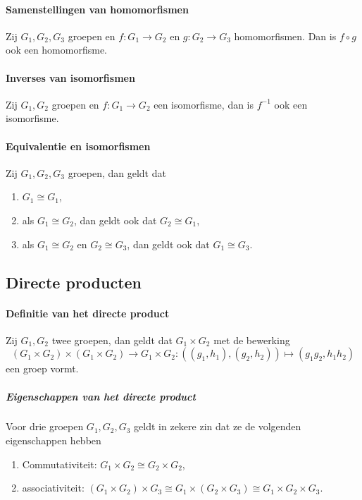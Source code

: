 \paragraph{Samenstellingen van homomorfismen} Zij \(G_{1},G_{2},G_{3}\) groepen en \(f\colon G_{1}\to G_{2}\) en \(g\colon G_{2}\to G_{3}\) homomorfismen. Dan is \(f\circ g\) ook een homomorfisme.

\paragraph{Inverses van isomorfismen} Zij \(G_{1},G_{2}\) groepen en \(f\colon G_{1}\to G_{2}\) een isomorfisme, dan is \(f^{-1}\) ook een isomorfisme.

\paragraph{Equivalentie en isomorfismen} Zij \(G_{1},G_{2},G_{3}\) groepen, dan geldt dat
\begin{enumerate}
    \item \(G_{1}\cong G_{1}\),
    \item als \(G_{1}\cong G_{2}\), dan geldt ook dat \(G_{2}\cong G_{1}\),
    \item als \(G_{1}\cong G_{2}\) en \(G_{2}\cong G_{3}\), dan geldt ook dat \(G_{1}\cong G_{3}\).
\end{enumerate}

\subsection{Directe producten}
\paragraph{Definitie van het directe product} Zij \(G_{1},G_{2}\) twee groepen, dan geldt dat \(G_{1}\times G_{2}\) met de bewerking
\[
    (G_{1}\times G_{2})\times(G_{1}\times G_{2})\to G_{1}\times G_{2}\colon ((g_{1},h_{1}),(g_{2},h_{2}))\mapsto (g_{1}g_{2},h_{1}h_{2})
\]
een groep vormt.

\subparagraph{Eigenschappen van het directe product} Voor drie groepen \(G_{1},G_{2},G_{3}\) geldt in zekere zin dat ze de volgenden eigenschappen hebben
\begin{enumerate}
    \item Commutativiteit: \(G_{1}\times G_{2}\cong G_{2}\times G_{2}\),
    \item associativiteit: \((G_{1}\times G_{2})\times G_{3}\cong G_{1}\times(G_{2}\times G_{3})\cong G_{1}\times G_{2}\times G_{3}\).
\end{enumerate}

